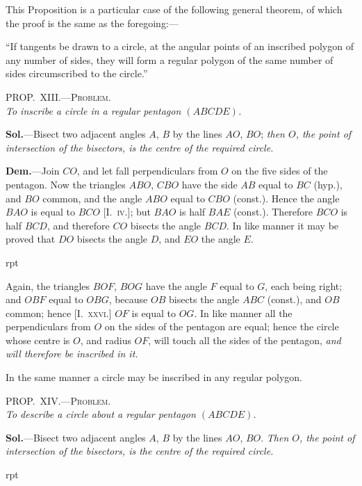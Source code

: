 \documentclass[oneside]{book}
\newcounter{wrapwidth}
\newcommand\myprop[2]{
\bigskip\Needspace*{4\baselineskip}\begin{center}\textsc{#1}\\\medskip\emph{#2}\par\end{center}
}
\newcommand\imgflow[3]{
\setcounter{wrapwidth}{#1}

\begin{wrapfigure}[#2]{r}{\value{wrapwidth}pt}
\begin{center}
\vspace{-0.3in}

\end{center}
\end{wrapfigure}
}
\begin{document}
\begin{footnotesize}
This Proposition is a particular case of the following general
theorem, of which the proof is the same as the foregoing:---

``If tangents be drawn to a circle, at the angular points of an
inscribed polygon of any number of sides, they will form a regular
polygon of the same number of sides circumscribed to the circle.''
\par\end{footnotesize}

\myprop{PROP\@.~XIII\@.---Problem.}{To inscribe a circle in a regular pentagon $(ABCDE)$.}

\textbf{Sol.}---Bisect two adjacent angles $A$, $B$ by the lines
$AO$, $BO$; \textit{then $O$, the point of intersection of the bisectors,
is the centre of the required circle.}

\textbf{Dem.}---Join $CO$, and let fall perpendiculars from $O$
on the five sides of the pentagon.
Now the triangles
$ABO$, $CBO$ have the side $AB$
equal to $BC$ (hyp.), and $BO$
common, and the angle $ABO$
equal to $CBO$ (const.). Hence
the angle $BAO$ is equal to
$BCO$ [I.~\textsc{iv.}]; but $BAO$ is half
$BAE$ (const.). Therefore $BCO$
is half $BCD$, and therefore $CO$
bisects the angle $BCD$. In
like manner it may be proved that $DO$ bisects the
angle $D$, and $EO$ the angle $E$.




\imgflow{133}{11}{f165}

Again, the triangles $BOF$, $BOG$ have the angle $F$
equal to $G$, each being right; and $OBF$ equal to $OBG$,
because $OB$ bisects the angle $ABC$ (const.), and $OB$
common; hence [\textsc{I.~xxvi.}] $OF$ is equal to $OG$. In like
manner all the perpendiculars from $O$ on the sides of
the pentagon are equal; hence the circle whose centre
is $O$, and radius $OF$, will touch all the sides of the
pentagon, \emph{and will therefore be inscribed in it.}

In the same manner a circle may be inscribed in
any regular polygon.

\myprop{PROP\@.~XIV\@.---Problem.}{To describe a circle about a regular pentagon $(ABCDE)$.}

\textbf{Sol.}---Bisect two adjacent angles $A$, $B$ by the lines
$AO$, $BO$. \emph{Then $O$, the point of intersection of the bisectors,
is the centre of the required circle.}


\imgflow{110}{10}{f166}
\end{document}
